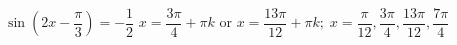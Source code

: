 { $\sin \left( 2x - \dfrac{\pi}{3} \right) = -\dfrac{1}{2}$}
{ $x = \dfrac{3\pi}{4} + \pi k$ or $x = \dfrac{13\pi}{12} + \pi k; \; x = \dfrac{\pi}{12}, \dfrac{3\pi}{4}, \dfrac{13\pi}{12}, \dfrac{7\pi}{4}$}
